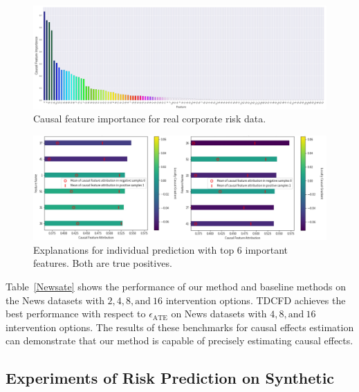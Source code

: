 \documentclass[letterpaper]{article} %
\theoremstyle{definition}
\theoremstyle{remark}
\begin{document}
\begin{figure}[t]
  \centering
  \includegraphics[width=1\linewidth]{Causal_Feature_Importance.jpg}
 \vspace{-3mm}
  \caption{Causal feature importance for real corporate risk data.}
 \vspace{-3mm}
  \label{fig:importance}
\end{figure}


\begin{figure}[t!]
  \centering
  \includegraphics[width=1\linewidth]{output.jpg}
 \vspace{-3mm}
  \caption{Explanations for individual prediction with top $6$ important features. Both are true positives.}
 \vspace{-5mm}
  \label{fig:output}
\end{figure}


Table~\ref{Newsate} shows the performance of our method and baseline methods on the News datasets with $2, 4, 8, \text{and} \ 16$ intervention options. TDCFD achieves the best performance with respect to $\epsilon_\text{ATE}$ on News datasets with $4, 8, \text{and} \ 16$ intervention options. The results of these benchmarks for causal effects estimation can demonstrate that our method is capable of precisely estimating causal effects.  


\subsection{Experiments of Risk Prediction on Synthetic}
\end{document}
